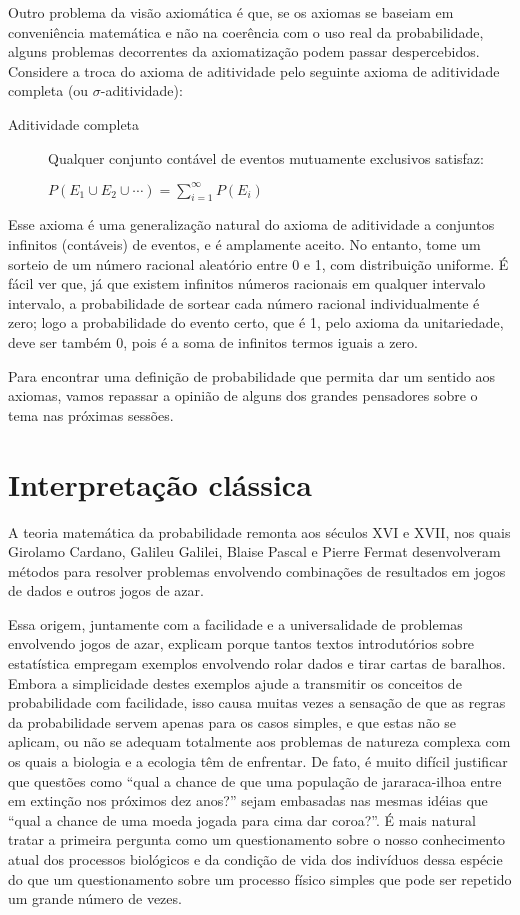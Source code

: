 Outro problema da visão axiomática é que, se os axiomas se baseiam em conveniência matemática e não na coerência com o uso 
real da probabilidade, alguns problemas decorrentes da axiomatização podem passar despercebidos. Considere a troca do axioma
de aditividade pelo seguinte axioma de aditividade completa (ou $\sigma$-aditividade):

\begin{description}
	\item[Aditividade completa] Qualquer conjunto contável de eventos mutuamente exclusivos satisfaz:

		$P(E_1 \cup E_2 \cup \cdots) = \sum_{i=1}^\infty P(E_i)$
\end{description}

Esse axioma é uma generalização natural do axioma de aditividade a conjuntos infinitos (contáveis) de eventos, e é amplamente
aceito. No entanto, tome um sorteio de um número racional aleatório entre 0 e 1, com distribuição uniforme. É fácil ver que,
já que existem infinitos números racionais em qualquer intervalo intervalo,
a probabilidade de sortear cada número racional individualmente é zero; logo a probabilidade do evento certo, que é 1, 
pelo axioma da unitariedade, deve ser também 0, pois é a soma de infinitos termos iguais a zero.

Para encontrar uma definição de probabilidade que permita dar um sentido aos axiomas, vamos repassar a opinião de alguns dos 
grandes pensadores sobre o tema nas próximas sessões.

\section{Interpretação clássica}
A teoria matemática da probabilidade remonta aos séculos XVI e XVII, nos quais Girolamo Cardano, Galileu Galilei, Blaise Pascal
e Pierre Fermat desenvolveram métodos para resolver problemas envolvendo combinações de resultados em jogos de dados e outros
jogos de azar. 

Essa origem, juntamente com a facilidade e a universalidade de problemas envolvendo jogos de azar, explicam porque tantos textos
introdutórios sobre estatística empregam exemplos envolvendo rolar dados e tirar cartas de baralhos. Embora a simplicidade
destes exemplos ajude a transmitir os conceitos de probabilidade com facilidade, isso causa muitas vezes a sensação de que
as regras da probabilidade servem apenas para os casos simples, e que estas não se aplicam, ou não se adequam totalmente aos 
problemas de natureza complexa com os quais a biologia e a ecologia têm de enfrentar. De fato, é muito difícil justificar que
questões como ``qual a chance de que uma população de jararaca-ilhoa entre em extinção nos próximos dez anos?'' sejam embasadas
nas mesmas idéias que ``qual a chance de uma moeda jogada para cima dar coroa?''. É mais natural tratar a primeira pergunta como
um questionamento sobre o nosso conhecimento atual dos processos biológicos e da condição de vida dos indivíduos dessa espécie
do que um questionamento sobre um processo físico simples que pode ser repetido um grande número de vezes. 

